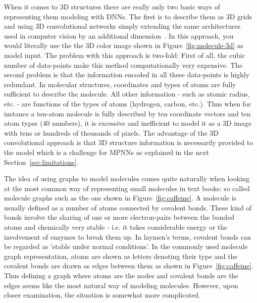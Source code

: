 When it comes to 3D structures there are really only two basic ways of representing them modeling with DNNs. The first is to describe them as 3D grids and using 3D convolutional networks simply extending the same architectures used in computer vision by an additional dimension~\cite{Wallach2015}. In this approach, you would literally use the the 3D color image shown in Figure~\ref{fig:molecule-3d} as model input. The problem with this approach is two-fold: First of all, the cubic number of data-points make this method computationally very expensive. The second problem is that the information encoded in all these data-points is highly redundant. In molecular structures, coordinates and types of atoms are fully sufficient to describe the molecule. All other information - such as atomic radius, etc. - are functions of the types of atoms (hydrogen, carbon, etc.). Thus when for instance a ten-atom molecule is fully described by ten coordinate vectors and ten atom types (40 numbers), it is excessive and inefficient to model it as a 3D image with tens or hundreds of thousands of pixels. The advantage of the 3D convolutional approach is that 3D structure information is necessarily provided to the model which is a challenge for MPNNs as explained in the next Section~\ref{sec:limitations}.



The idea of using graphs to model molecules comes quite naturally when looking at the most common way of representing small molecules in text books: so called molecule graphs such as the one shown in Figure~\ref{fig:caffeine}. A molecule is usually defined as a number of atoms connected by covalent bonds. These kind of bonds involve the sharing of one or more electron-pairs between the bonded atoms and chemically very stable - i.e. it takes considerable energy or the involvement of enzymes to break them up. In laymen's terms, covalent bonds can be regarded as 'stable under normal conditions'. In the commonly used molecule graph representation, atoms are shown as letters denoting their type and the covalent bonds are drawn as edges between them as shown in Figure~\ref{fig:caffeine}. Thus defining a graph where atoms are the nodes and covalent bonds are the edges seems like the most natural way of modeling molecules. However, upon closer examination, the situation is somewhat more complicated.


